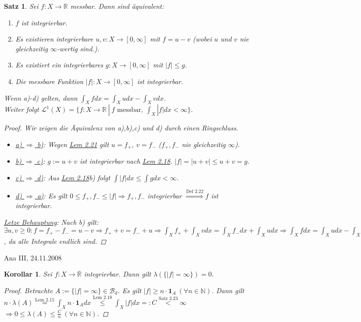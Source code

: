 \documentclass[a4paper]{report}
\newcommand{\doubleOne}{\textbf{1}}
\newcommand{\R}{\mathbb{R}}
\newcommand{\Rq}{\overline{\R}}
\newcommand{\N}{\mathbb{N}}
\newcommand{\Borel}{\mathcal{B}}
\newcommand{\Bd}{\Borel_d}
\newcommand{\Leb}{\mathcal{L}}
\newcommand{\jlabel}[1]{\label{j_#1}}
\newcommand{\jshortlink}[1]{\jhyperref{#1}{\text{#1}}}
\newcommand{\jhyperref}[2]{\hyperref[j_#1]{#2}}
\newcommand{\jlink}[1]{\jhyperref{#1}{#1}}
\newcommand{\jabb}[3]{ #1: #2 \rightarrow #3 }
\newcommand{\jspacesmall}{\vspace{4pt}}
\newcommand{\jdate}[1]{\jspacesmall\begin{center}\jlabel{#1}\tiny{Ana III, #1}\end{center}}
\theoremstyle{plain}
\newtheorem{satz}[thm]{Satz}
\newtheorem{kor}[thm]{Korollar}
\theoremstyle{definition}
\begin{document}
{{{\begin{satz}
\jlabel{Satz 2.23}
    Sei $\jabb{f}{X}{\R}$ messbar. Dann sind äquivalent:
    \begin{enumerate}
        \item $f$ ist integrierbar.
        \item Es existieren integrierbare $\jabb{u,v}{X}{[0,\infty]}$ mit $f=u-v$ (wobei $u$ und $v$ nie gleichzeitig $\infty$-wertig sind.).
        \item Es existiert ein integrierbares $\jabb{g}{X}{[0,\infty]}$ mit $|f| \le g$.
        \item Die messbare Funktion $\jabb{|f|}{X}{[0,\infty]}$ ist integrierbar.
    \end{enumerate}
    Wenn a)-d) gelten, dann $\int_X f dx = \int_X u dx - \int_X v dx$.\\
    Weiter folgt $\Leb^1(X) = \{\jabb{f}{X}{\R} \ | \ f \text{ messbar}, \ \int_X |f| dx < \infty\}$.
    \begin{proof}
        Wir zeigen die Äquivalenz von a),b),c) und d) durch einen Ringschluss.
        \begin{itemize}
            \item \uline{a) $\Rightarrow$ b)}: Wegen \jlink{Lem 2.21} gilt $u=f_+, \ v=f_-$ ($f_+,f_-$ nie gleichzeitig $\infty$).
            \item \uline{b) $\Rightarrow$ c)}: $g := u+v$ ist integrierbar nach \jlink{Lem 2.18}. $|f| = |u+v| \le u+v =g$.
            \item \uline{c) $\Rightarrow$ d)}: Aus \jlink{Lem 2.18}b) folgt $\int |f|dx \le \int g dx < \infty$.
            \item \uline{d) $\Rightarrow$ a)}: Es gilt $0 \le f_+,f_- \le |f| \Rightarrow f_+,f_-$ integrierbar $\overset{\jshortlink{Def 2.22}}{\Rightarrow} f$ ist integrierbar.
        \end{itemize}
        \uline{Letze Behauptung}: Nach b) gilt: $\exists u,v\ge 0: f=f_+-f_- = u-v \Rightarrow f_++v = f_-+u \Rightarrow \int_X f_+ + \int_X v dx = \int_X f_- dx + \int_X u dx \Rightarrow \int_X f dx = \int_X u dx - \int_X v dx$, da alle Integrale endlich sind.
    \end{proof}
\end{satz}

\jdate{24.11.2008}

{\begin{kor}
\jlabel{Kor 2.24}
    Sei $\jabb{f}{X}{\Rq}$ integrierbar. Dann gilt $\lambda(\{|f| = \infty\}) = 0$.
    \begin{proof}
        Betrachte $A:= \{|f| = \infty\} \in \Bd$. Es gilt $|f| \ge n\cdot \doubleOne_A \ (\forall n\in\N)$. Dann gilt $n\cdot \lambda(A) \overset{\jshortlink{Lem 2.15}}{=} \int_X n\cdot \doubleOne_A dx \overset{\jshortlink{Lem 2.18}}{\le} \int_X |f| dx =: C \overset{\jshortlink{Satz 2.23}}{<} \infty$\\
        $\Rightarrow 0 \le \lambda(A) \le \frac{C}{n} \ (\forall n\in\N)$.
    \end{proof}
\end{kor}

}}}}
\end{document}
